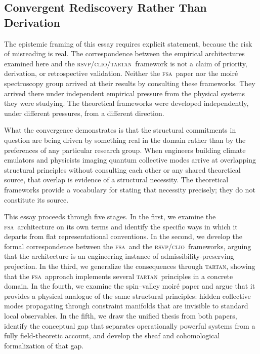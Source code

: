 \documentclass[11pt,a4paper]{article}
\theoremstyle{plain}
\theoremstyle{definition}
\theoremstyle{remark}
\newcommand{\RSVP}{\textup{\textsc{rsvp}}}
\newcommand{\CLIO}{\textup{\textsc{clio}}}
\newcommand{\TARTAN}{\textup{\textsc{tartan}}}
\newcommand{\FSA}{\textup{\textsc{fsa}}}
\begin{document}
\subsection{Convergent Rediscovery Rather Than Derivation}

The epistemic framing of this essay requires explicit statement, because
the risk of misreading is real. The correspondence between the empirical
architectures examined here and the \RSVP/\CLIO/\TARTAN\ framework is not
a claim of priority, derivation, or retrospective validation. Neither the
\FSA\ paper nor the moiré spectroscopy group arrived at their results by
consulting these frameworks. They arrived there under independent empirical
pressure from the physical systems they were studying. The theoretical
frameworks were developed independently, under different pressures, from a
different direction.

What the convergence demonstrates is that the structural commitments in
question are being driven by something real in the domain rather than by
the preferences of any particular research group. When engineers building
climate emulators and physicists imaging quantum collective modes arrive at
overlapping structural principles without consulting each other or any
shared theoretical source, that overlap is evidence of a structural
necessity. The theoretical frameworks provide a vocabulary for stating that
necessity precisely; they do not constitute its source.

This essay proceeds through five stages. In the first, we examine the
\FSA\ architecture on its own terms and identify the specific ways in which
it departs from flat representational conventions. In the second, we
develop the formal correspondence between the \FSA\ and the \RSVP/\CLIO\
frameworks, arguing that the architecture is an engineering instance of
admissibility-preserving projection. In the third, we generalize the
consequences through \TARTAN, showing that the \FSA\ approach implements
several \TARTAN\ principles in a concrete domain. In the fourth, we
examine the spin--valley moiré paper and argue that it provides a physical
analogue of the same structural principles: hidden collective modes
propagating through constraint manifolds that are invisible to standard
local observables. In the fifth, we draw the unified thesis from both
papers, identify the conceptual gap that separates operationally powerful
systems from a fully field-theoretic account, and develop the sheaf and
cohomological formalization of that gap.
\end{document}

